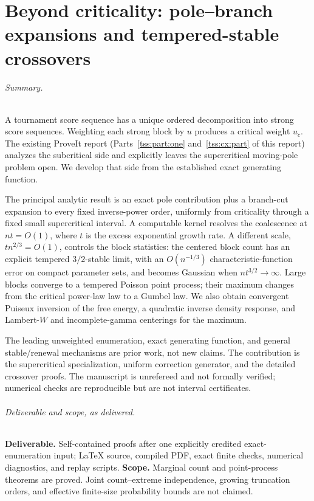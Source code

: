 \documentclass[11pt]{article}
\theoremstyle{remark}\newtheorem{remark}[theorem]{Remark}
\theoremstyle{definition}\newtheorem{definition}[theorem]{Definition}
\begin{document}
\clearpage
{}
\part[Beyond criticality: pole--branch expansions and tempered crossovers]{Beyond criticality: pole--branch expansions and tempered-stable crossovers}\label{tss:sc:part}

\paragraph{Summary.}
A tournament score sequence has a unique ordered decomposition into strong score sequences. Weighting each strong block by $u$ produces a critical weight $u_c$. The existing ProveIt report (Parts~\ref{tss:part:one} and~\ref{tss:cx:part} of this report) analyzes the subcritical side and explicitly leaves the supercritical moving-pole problem open. We develop that side from the established exact generating function.

The principal analytic result is an exact pole contribution plus a branch-cut expansion to every fixed inverse-power order, uniformly from criticality through a fixed small supercritical interval. A computable kernel resolves the coalescence at $nt=O(1)$, where $t$ is the excess exponential growth rate. A different scale, $t n^{2/3}=O(1)$, controls the block statistics: the centered block count has an explicit tempered $3/2$-stable limit, with an $O(n^{-1/3})$ characteristic-function error on compact parameter sets, and becomes Gaussian when $nt^{3/2}\to\infty$. Large blocks converge to a tempered Poisson point process; their maximum changes from the critical power-law law to a Gumbel law. We also obtain convergent Puiseux inversion of the free energy, a quadratic inverse density response, and Lambert-$W$ and incomplete-gamma centerings for the maximum.

The leading unweighted enumeration, exact generating function, and general stable/renewal mechanisms are prior work, not new claims. The contribution is the supercritical specialization, uniform correction generator, and the detailed crossover proofs. The manuscript is unrefereed and not formally verified; numerical checks are reproducible but are not interval certificates.

\paragraph{Deliverable and scope, as delivered.}
\textbf{Deliverable.} Self-contained proofs after one explicitly credited exact-enumeration input; LaTeX source, compiled PDF, exact finite checks, numerical diagnostics, and replay scripts.
\textbf{Scope.} Marginal count and point-process theorems are proved. Joint count--extreme independence, growing truncation orders, and effective finite-size probability bounds are not claimed.
\end{document}
